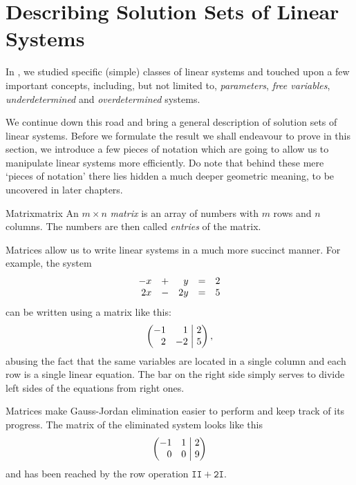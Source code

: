 \section{Describing Solution Sets of Linear Systems}
\label{sec:describing-solution-sets-of-linear-systems}

In , we studied specific (simple) classes of
linear systems and touched upon a few important concepts, including, but not
limited to, \emph{parameters}, \emph{free variables}, \emph{underdetermined} and
\emph{overdetermined} systems.

We continue down this road and bring a general description of solution sets of
linear systems. Before we formulate the result we shall endeavour to prove in
this section, we introduce a few pieces of notation which are going to allow us
to manipulate linear systems more efficiently. Do note that behind these mere
`pieces of notation' there lies hidden a much deeper geometric meaning, to be
uncovered in later chapters.

\begin{definition}{Matrix}{matrix}
 An $m \times n$ \emph{matrix} is an array of numbers with $m$ rows and $n$
 columns. The numbers are then called \emph{entries} of the matrix.
\end{definition}

Matrices allow us to write linear systems in a much more succinct manner. For
example, the system
\[
 \begin{array}{r c r c r}
  -x & + & y & = & 2\\
  2x & - & 2y & = & 5
 \end{array}
\]
can be written using a matrix like this:
\[
 \left(
  \begin{matrix*}[r]
   -1 & 1\\
   2 & -2
  \end{matrix*}
  \hspace{1mm}
 \right|
 \left.
  \begin{matrix*}[r]
   2\\
   5
  \end{matrix*}
 \right),
\]
abusing the fact that the same variables are located in a single column and each
row is a single linear equation. The bar on the right side simply serves to
divide left sides of the equations from right ones.

Matrices make Gauss-Jordan elimination easier to perform and keep track of its
progress. The matrix of the eliminated system looks like this
\[
 \left(
  \begin{matrix*}[r]
   -1 & 1\\
   0 & 0
  \end{matrix*}
  \hspace{1mm}
 \right|
 \left.
  \begin{matrix*}[r]
   2\\
   9
  \end{matrix*}
 \right)
\]
and has been reached by the row operation $\mathtt{II + 2I}$.

